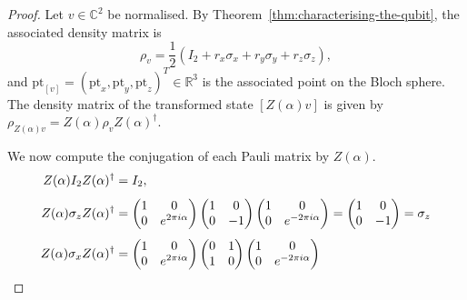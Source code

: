 \documentclass[a4paper, oneside, 12pt]{amsart}
\begin{document}
\begin{proof}
  Let \( v \in \mathbb{C}^2 \) be normalised.
  By Theorem~\ref{thm:characterising-the-qubit}, the associated density matrix is
  \begin{equation*}
    \rho_{v} = \frac{1}{2}(I_2 + r_x \sigma_x + r_y \sigma_y + r_z \sigma_z),
  \end{equation*}
  and \( \mathrm{pt}_{[v]} = (\mathrm{pt}_x, \mathrm{pt}_y, \mathrm{pt}_z)^{T}\in \mathbb{R}^{3}\) is the associated point on the Bloch sphere.
  The density matrix of the transformed state \( [Z(\alpha)v] \) is given by \(\rho_{Z(\alpha)v} = Z(\alpha) \rho_{v} Z(\alpha)^\dagger\).

  We now compute the conjugation of each Pauli matrix by \( Z(\alpha) \).
  \begin{align*}
    Z(\alpha) I_2 Z(\alpha)^\dagger
    &= I_2, \\[0.25\baselineskip]
    Z(\alpha) \sigma_z Z(\alpha)^\dagger
    &=
      \begin{pmatrix}
        1 & 0 \\
        0 & e^{2\pi i \alpha}
      \end{pmatrix}
      \begin{pmatrix}
        1 & 0 \\
        0 & -1
      \end{pmatrix}
      \begin{pmatrix}
        1 & 0 \\
        0 & e^{- 2\pi i \alpha}
      \end{pmatrix}
      =
      \begin{pmatrix}
        1 & 0 \\
        0 & -1
      \end{pmatrix}
      =\sigma_{z}
    \\[0.25\baselineskip]
    Z(\alpha) \sigma_x Z(\alpha)^\dagger
    & =
      \begin{pmatrix}
        1 & 0 \\
        0 & e^{2\pi i \alpha}
      \end{pmatrix}
      \begin{pmatrix}
        0 & 1 \\
        1 & 0
      \end{pmatrix}
      \begin{pmatrix}
        1 & 0 \\
        0 & e^{-2\pi i \alpha}
      \end{pmatrix}\\

\end{align*}
\end{proof}
\end{document}
